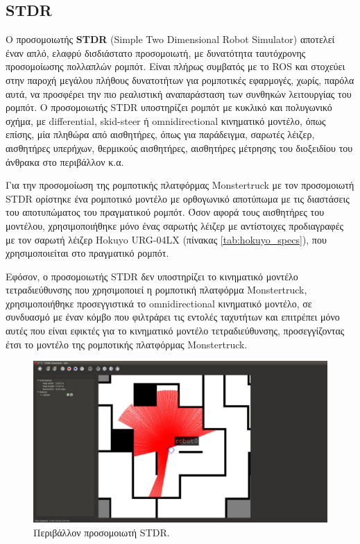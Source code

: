 \subsection{STDR} \label{ssec:stdr}
Ο προσομοιωτής \textbf{STDR} (Simple Two Dimensional Robot Simulator) αποτελεί έναν απλό, ελαφρύ δισδιάστατο προσομοιωτή, με δυνατότητα ταυτόχρονης προσομοίωσης πολλαπλών ρομπότ. Είναι πλήρως συμβατός με το ROS και στοχεύει στην παροχή μεγάλου πλήθους δυνατοτήτων για ρομποτικές εφαρμογές, χωρίς, παρόλα αυτά, να προσφέρει την πιο ρεαλιστική αναπαράσταση των συνθηκών λειτουργίας του ρομπότ. Ο προσομοιωτής STDR υποστηρίζει ρομπότ με κυκλικό και πολυγωνικό σχήμα, με differential, skid-steer ή omnidirectional κινηματικό μοντέλο, όπως επίσης, μία πληθώρα από αισθητήρες, όπως για παράδειγμα, σαρωτές λέιζερ, αισθητήρες υπερήχων, θερμικούς αισθητήρες, αισθητήρες μέτρησης του διοξειδίου του άνθρακα στο περιβάλλον κ.α. 

\bigskip
Για την προσομοίωση της ρομποτικής πλατφόρμας Monstertruck με τον προσομοιωτή STDR ορίστηκε ένα ρομποτικό μοντέλο με ορθογωνικό αποτύπωμα με τις διαστάσεις του αποτυπώματος του πραγματικού ρομπότ. Όσον αφορά τους αισθητήρες του μοντέλου, χρησιμοποιήθηκε μόνο ένας σαρωτής λέιζερ με αντίστοιχες προδιαγραφές με τον σαρωτή λέιζερ Hokuyo URG-04LX  (πίνακας \ref{tab:hokuyo_specs}), που χρησιμοποιείται στο πραγματικό ρομπότ.

\bigskip
Εφόσον, ο προσομοιωτής STDR δεν υποστηρίζει το κινηματικό μοντέλο τετραδιεύθυνσης που χρησιμοποιεί η ρομποτική πλατφόρμα Monstertruck, χρησιμοποιήθηκε προσεγγιστικά το omnidirectional κινηματικό μοντέλο, σε συνδυασμό με έναν κόμβο που φιλτράρει τις εντολές ταχυτήτων και επιτρέπει μόνο αυτές που είναι εφικτές για το κινηματικό μοντέλο τετραδιεύθυνσης, προσεγγίζοντας έτσι το μοντέλο της ρομποτικής πλατφόρμας Monstertruck.

\begin{figure}[!ht]
	\centering
	\includegraphics[width=0.7\linewidth]{Chapters/Chapter4/Figures/stdr_simulator.jpg}
	\caption{Περιβάλλον προσομοιωτή STDR.}
	\label{fig:stdr_simulator}
\end{figure}

